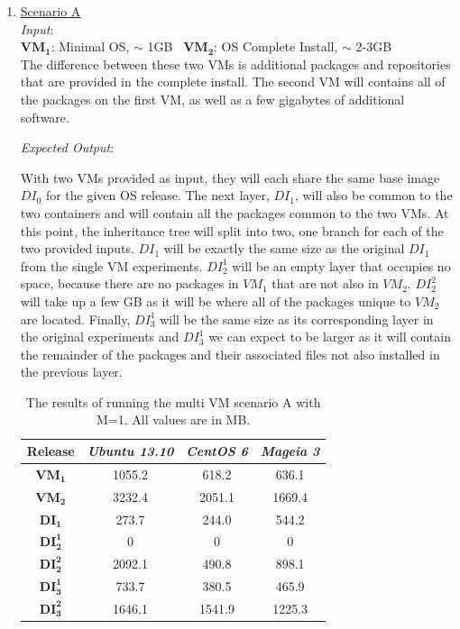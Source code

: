 \begin{enumerate}
\item \underline{Scenario A}\\
\textit{Input}:\\
$\boldsymbol{VM_1}$: Minimal OS, $\sim$ 1GB \textemdash\ $\boldsymbol{VM_2}$: OS Complete Install, $\sim$ 2-3GB\\

The difference between these two VMs is additional packages and repositories that are provided in the complete install. The second VM will contains all of the packages on the first VM, as well as a few gigabytes of additional software.


\textit{Expected Output}:

With two VMs provided as input, they will each share the same base image $DI_0$ for the given OS release. The next layer, $DI_1$, will also be common to the two containers and will contain all the packages common to the two VMs. At this point, the inheritance tree will split into two, one branch for each of the two provided inputs. $DI_1$ will be exactly the same size as the original $DI_1$ from the single VM experiments. $DI_2^1$ will be an empty layer that occupies no space, because there are no packages in $VM_1$ that are not also in $VM_2$. $DI_2^2$ will take up a few GB as it will be where all of the packages unique to $VM_2$ are located. Finally, $DI_3^1$ will be the same size as its corresponding layer in the original experiments and $DI_3^1$ we can expect to be larger as it will contain the remainder of the packages and their associated files not also installed in the previous layer.

\begin{table}[h]
\centering
    \begin{tabular}{| c | c | c | c|}
    \hline
    \bfseries Release & \itshape Ubuntu 13.10 & \itshape CentOS 6 & \itshape Mageia 3\\ \hline
\bfseries $\boldsymbol{VM_1}$ & 1055.2 & 618.2 & 636.1\\ \hline
\bfseries $\boldsymbol{VM_2}$ & 3232.4 & 2051.1 & 1669.4\\ \hline \hline
    \bfseries $\boldsymbol{DI_1}$ & 273.7 & 244.0 & 544.2\\ \hline
    \bfseries $\boldsymbol{DI_2^1}$ & 0 & 0 & 0\\ \hline 
\bfseries $\boldsymbol{DI_2^2}$ & 2092.1 & 490.8 & 898.1\\ \hline 
\bfseries $\boldsymbol{DI_3^1}$  & 733.7 & 380.5 & 465.9\\ \hline 
\bfseries $\boldsymbol{DI_3^2}$ & 1646.1 & 1541.9 & 1225.3\\ \hline 
    \end{tabular}
\caption{The results of running the multi VM scenario A with M=1. All values are in MB.}
\label{table:multiscenarioa}
\end{table}




\end{enumerate}

